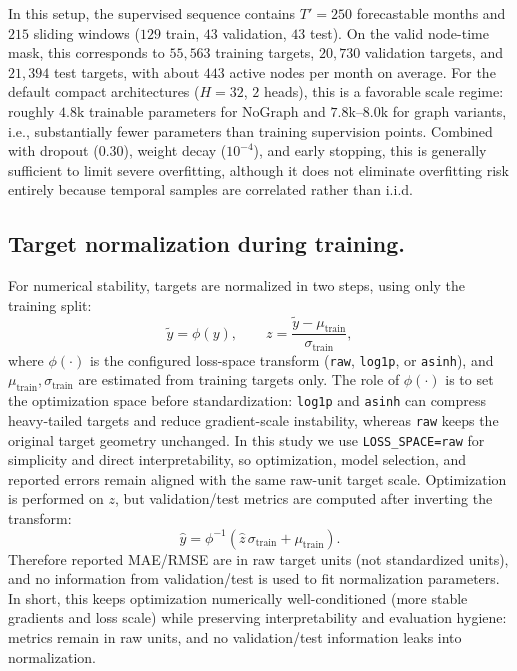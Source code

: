 \documentclass{article}
\begin{document}
In this setup, the supervised sequence contains \(T'=250\) forecastable months and \(215\) sliding windows
(\(129\) train, \(43\) validation, \(43\) test). On the valid node-time mask, this corresponds to
\(55{,}563\) training targets, \(20{,}730\) validation targets, and \(21{,}394\) test targets, with
about \(443\) active nodes per month on average. For the default compact architectures
(\(H=32\), \(2\) heads), this is a favorable scale regime: roughly \(4.8\)k trainable parameters for
NoGraph and \(7.8\)k--\(8.0\)k for graph variants, i.e., substantially fewer parameters than training
supervision points. Combined with dropout (\(0.30\)), weight decay (\(10^{-4}\)), and early stopping,
this is generally sufficient to limit severe overfitting, although it does not eliminate overfitting risk
entirely because temporal samples are correlated rather than i.i.d.

\subsection{Target normalization during training.}
For numerical stability, targets are normalized in two steps, using only the training split:
\[
\tilde{y}=\phi(y), \qquad z=\frac{\tilde{y}-\mu_{\text{train}}}{\sigma_{\text{train}}},
\]
where $\phi(\cdot)$ is the configured loss-space transform (\texttt{raw}, \texttt{log1p}, or \texttt{asinh}), and
$\mu_{\text{train}},\sigma_{\text{train}}$ are estimated from training targets only.
The role of $\phi(\cdot)$ is to set the optimization space before standardization:
\texttt{log1p} and \texttt{asinh} can compress heavy-tailed targets and reduce gradient-scale instability,
whereas \texttt{raw} keeps the original target geometry unchanged.
In this study we use \texttt{LOSS\_SPACE=raw} for simplicity and direct interpretability,
so optimization, model selection, and reported errors remain aligned with the same raw-unit target scale.
Optimization is performed on $z$, but validation/test metrics are computed after inverting the transform:
\[
\hat{y}=\phi^{-1}\!\left(\hat{z}\,\sigma_{\text{train}}+\mu_{\text{train}}\right).
\]
Therefore reported MAE/RMSE are in raw target units (not standardized units), and no information from validation/test
is used to fit normalization parameters.
In short, this keeps optimization numerically well-conditioned (more stable gradients and loss scale) while preserving
interpretability and evaluation hygiene: metrics remain in raw units, and no validation/test information leaks into
normalization.
\end{document}
